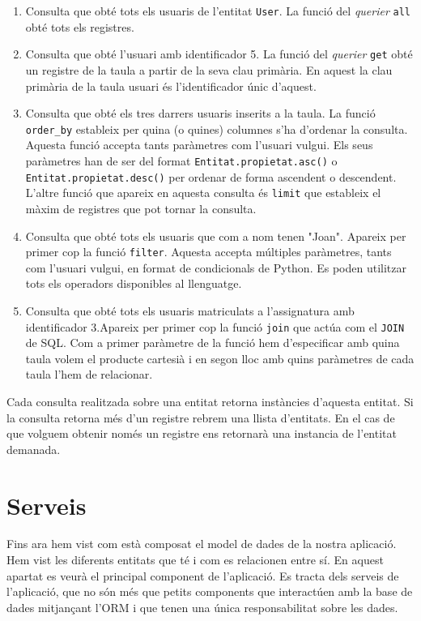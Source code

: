 	\begin{enumerate}
		\item Consulta que obté tots els usuaris de l'entitat \texttt{User}. La funció del \emph{querier} \texttt{all} obté tots els registres.
		
		\item Consulta que obté l'usuari amb identificador 5. La funció del \emph{querier} \texttt{get} obté un registre de la taula a partir de la seva clau primària. En aquest la clau primària de la taula usuari és l'identificador únic d'aquest.
		
		\item Consulta que obté els tres darrers usuaris inserits a la taula. La funció \texttt{order\_by} estableix per quina (o quines) columnes s'ha d'ordenar la consulta. Aquesta funció accepta tants paràmetres com l'usuari vulgui. Els seus paràmetres han de ser del format \texttt{Entitat.propietat.asc()} o \texttt{Entitat.propietat.desc()} per ordenar de forma ascendent o descendent. L'altre funció que apareix en aquesta consulta és \texttt{limit} que estableix el màxim de registres que pot tornar la consulta.
		
		\item Consulta que obté tots els usuaris que com a nom tenen "Joan". Apareix per primer cop la funció \texttt{filter}. Aquesta accepta múltiples paràmetres, tants com l'usuari vulgui, en format de condicionals de Python. Es poden utilitzar tots els operadors disponibles al llenguatge.
		
		\item Consulta que obté tots els usuaris matriculats a l'assignatura amb identificador 3.Apareix per primer cop la funció \texttt{join} que actúa com el \texttt{JOIN} de \ac{SQL}. Com a primer paràmetre de la funció hem d'especificar amb quina taula volem el producte cartesià i en segon lloc amb quins paràmetres de cada taula l'hem de relacionar.
		
	\end{enumerate}
	
	Cada consulta realitzada sobre una entitat retorna instàncies d'aquesta entitat. Si la consulta retorna més d'un registre rebrem una llista d'entitats. En el cas de que volguem obtenir només un registre ens retornarà una instancia de l'entitat demanada.

  
\section{Serveis}
	Fins ara hem vist com està composat el model de dades de la nostra aplicació. Hem vist les diferents entitats que té i com es relacionen entre sí. En aquest apartat es veurà el principal component de l'aplicació. Es tracta dels serveis de l'aplicació, que no són més que petits components que interactúen amb la base de dades mitjançant l'\ac{ORM} i que tenen una única responsabilitat sobre les dades. \\
	
